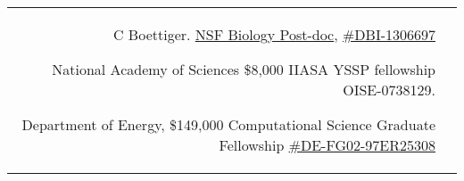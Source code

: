 \documentclass[10pt]{article} %
\begin{document}
\begin{paracol}{2}
\begin{supertabular}{rl}


  {C Boettiger. \href{http://www.nsf.gov/pubs/2012/nsf12497/nsf12497.htm}{NSF Biology
  Post-doc}, \href{http://www.nsf.gov/awardsearch/showAward?AWD_ID=1306697}{\#DBI-1306697}}

  {National Academy of Sciences \$8,000}
  {}
  {IIASA YSSP fellowship}
  {OISE-0738129}.

  {Department of Energy, \$149,000}
  {}
  {Computational Science Graduate Fellowship}
  {\href{https://www.krellinst.org/csgf/alumni/profile?n=boettiger2008}{\#DE-FG02-97ER25308}}



\end{supertabular}


\switchcolumn %



\end{paracol}
\end{document}

